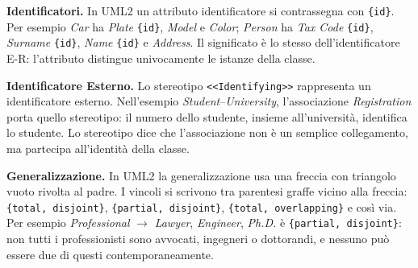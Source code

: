 \documentclass[12pt]{extarticle}
\begin{document}
\noindent \textbf{Identificatori.} In UML2 un attributo identificatore si contrassegna con \texttt{\{id\}}. Per esempio \textit{Car} ha \textit{Plate} \texttt{\{id\}}, \textit{Model} e \textit{Color}; \textit{Person} ha \textit{Tax Code} \texttt{\{id\}}, \textit{Surname} \texttt{\{id\}}, \textit{Name} \texttt{\{id\}} e \textit{Address}. Il significato è lo stesso dell'identificatore E-R: l'attributo distingue univocamente le istanze della classe.

\medskip
\noindent \textbf{Identificatore Esterno.} Lo stereotipo \texttt{<{}<Identifying>{}>} rappresenta un identificatore esterno. Nell'esempio \textit{Student}--\textit{University}, l'associazione \textit{Registration} porta quello stereotipo: il numero dello studente, insieme all'università, identifica lo studente. Lo stereotipo dice che l'associazione non è un semplice collegamento, ma partecipa all'identità della classe.

\medskip
\noindent \textbf{Generalizzazione.} In UML2 la generalizzazione usa una freccia con triangolo vuoto rivolta al padre. I vincoli si scrivono tra parentesi graffe vicino alla freccia: \texttt{\{total, disjoint\}}, \texttt{\{partial, disjoint\}}, \texttt{\{total, overlapping\}} e così via. Per esempio \textit{Professional} $\to$ \textit{Lawyer}, \textit{Engineer}, \textit{Ph.D.} è \texttt{\{partial, disjoint\}}: non tutti i professionisti sono avvocati, ingegneri o dottorandi, e nessuno può essere due di questi contemporaneamente.

\begin{center}
\end{center}
\end{document}
